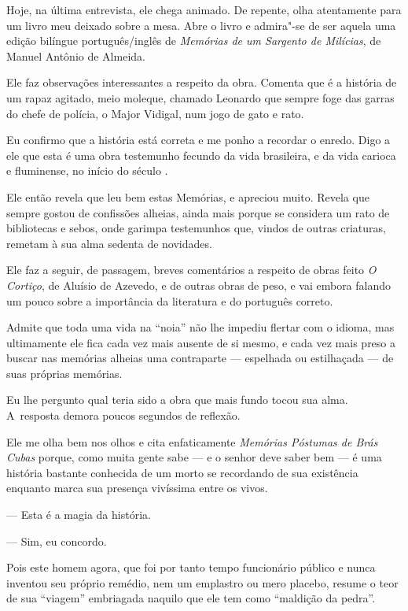 \asterisc{}

Hoje, na última entrevista, ele chega animado. De repente, olha
atentamente para um livro meu deixado sobre a mesa. Abre o livro e
admira"-se de ser aquela uma edição bilíngue português/inglês de \emph{Memórias
de um Sargento de Milícias}, de Manuel Antônio de Almeida.

Ele faz observações interessantes a respeito da obra. Comenta que é a
história de um rapaz agitado, meio moleque, chamado Leonardo que sempre
foge das garras do chefe de polícia, o Major Vidigal, num jogo de gato e
rato.

Eu confirmo que a história está correta e me ponho a recordar o enredo.
Digo a ele que esta é uma obra testemunho fecundo da vida brasileira, e
da vida carioca e fluminense, no início do século .

Ele então revela que leu bem estas Memórias, e apreciou muito. Revela
que sempre gostou de confissões alheias, ainda mais porque se considera
um rato de bibliotecas e sebos, onde garimpa testemunhos que, vindos de
outras criaturas, remetam à sua alma sedenta de novidades.

Ele faz a seguir, de passagem, breves comentários a respeito de obras
feito \emph{O Cortiço}, de Aluísio de Azevedo, e de outras obras de peso, e vai
embora falando um pouco sobre a importância da literatura e do português
correto.

Admite que toda uma vida na ``noia'' não lhe impediu flertar com o
idioma, mas ultimamente ele fica cada vez mais ausente de si mesmo, e
cada vez mais preso a buscar nas memórias alheias uma contraparte ---
espelhada ou estilhaçada --- de suas próprias memórias.

Eu lhe pergunto qual teria sido a obra que mais fundo tocou sua alma. A~resposta demora poucos segundos de reflexão.

Ele me olha bem nos olhos e cita enfaticamente \emph{Memórias Póstumas de Brás
Cubas} porque, como muita gente sabe --- e o senhor deve saber bem --- é
uma história bastante conhecida de um morto se recordando de sua
existência enquanto marca sua presença vivíssima entre os vivos.

— Esta é a magia da história.

— Sim, eu concordo.

Pois este homem agora, que foi por tanto tempo funcionário público e
nunca inventou seu próprio remédio, nem um emplastro ou mero placebo,
resume o teor de sua ``viagem'' embriagada naquilo que ele tem como
``maldição da pedra''.

